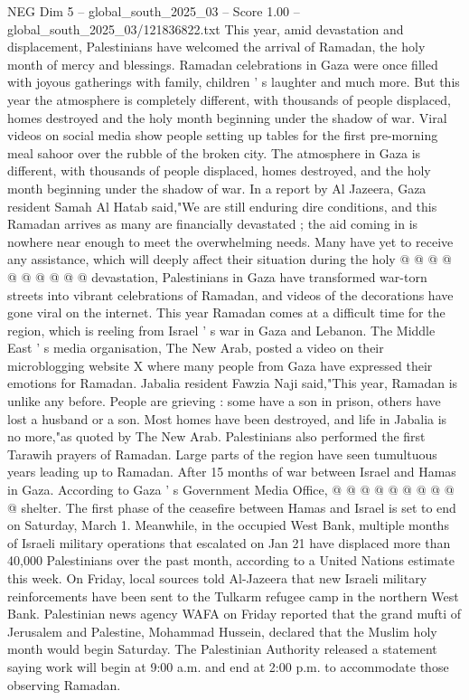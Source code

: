 \begin{textsample}{NEG Dim 5 – global\_south\_2025\_03 – Score 1.00 – global\_south\_2025\_03/121836822.txt}  \label{ex:f5_neg_267}
This year, amid devastation and displacement, Palestinians have welcomed the arrival of Ramadan, the holy month of mercy and blessings.
Ramadan celebrations in Gaza were once filled with joyous gatherings with family, children ' s laughter and much more.
But this year the atmosphere is completely different, with thousands of people displaced, homes destroyed and the holy month beginning under the shadow of war.
Viral videos on social media show people setting up tables for the first pre-morning meal sahoor over the rubble of the broken city.
The atmosphere in Gaza is different, with thousands of people displaced, homes destroyed, and the holy month beginning under the shadow of war.
In a report by Al Jazeera, Gaza resident Samah Al Hatab said,"We are still enduring dire conditions, and this Ramadan arrives as many are financially devastated ; the aid coming in is nowhere near enough to meet the overwhelming needs.
Many have yet to receive any assistance, which will deeply affect their situation during the holy @ @ @ @ @ @ @ @ @ @ devastation, Palestinians in Gaza have transformed war-torn streets into vibrant celebrations of Ramadan, and videos of the decorations have gone viral on the internet.
This year Ramadan comes at a difficult time for the region, which is reeling from Israel ' s war in Gaza and Lebanon.
The Middle East ' s media organisation, The New Arab, posted a video on their microblogging website X where many people from Gaza have expressed their emotions for Ramadan.
Jabalia resident Fawzia Naji said,"This year, Ramadan is unlike any before.
People are grieving : some have a son in prison, others have lost a husband or a son.
Most homes have been destroyed, and life in Jabalia is no more,"as quoted by The New Arab.
Palestinians also performed the first Tarawih prayers of Ramadan.
Large parts of the region have seen tumultuous years leading up to Ramadan.
After 15 months of war between Israel and Hamas in Gaza.
According to Gaza ' s Government Media Office, @ @ @ @ @ @ @ @ @ @ shelter.
The first phase of the ceasefire between Hamas and Israel is set to end on Saturday, March 1.
Meanwhile, in the occupied West Bank, multiple months of Israeli military operations that escalated on Jan 21 have displaced more than 40,000 Palestinians over the past month, according to a United Nations estimate this week.
On Friday, local sources told Al-Jazeera that new Israeli military reinforcements have been sent to the Tulkarm refugee camp in the northern West Bank.
Palestinian news agency WAFA on Friday reported that the grand mufti of Jerusalem and Palestine, Mohammad Hussein, declared that the Muslim holy month would begin Saturday.
The Palestinian Authority released a statement saying work will begin at 9:00 a.m. and end at 2:00 p.m. to accommodate those observing Ramadan.

\end{textsample}
